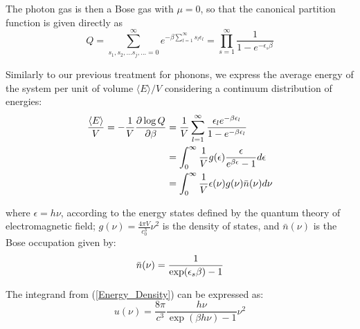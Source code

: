 \documentclass[book.tex]{subfiles}
\begin{document}
The photon gas is then a Bose gas with $\mu= 0$, so that the canonical partition function is given directly as
\begin{equation}\label{Part_photon}
Q = \sum_{s_1,s_2,...s_j,... = 0}^\infty e^{- \beta \sum_{l=1}^\infty s_l\epsilon_l} = \prod_{s=1}^\infty \frac{1}{1-e^{-\epsilon_{s}\beta}}
\end{equation}

Similarly to our previous treatment for phonons, we express the average energy of the system per unit of volume $\langle E\rangle/V$ considering a continuum distribution of energies:
\begin{align}\label{Energy_Density}
\frac{\langle E \rangle}{V} = -\frac{1}{V}\frac{\partial \log Q}{\partial \beta} &= \frac{1}{V}\sum_{l=1}^\infty \frac{\epsilon_le^{-\beta\epsilon_l}}{1 - e^{-\beta\epsilon_l}} \notag\\
&= \int_0^\infty \frac{1}{V}g(\epsilon)  \frac{\epsilon}{e^{\beta\epsilon}-1} d\epsilon \notag\\
&= \int_0^\infty \frac{1}{V}\epsilon(\nu)g(\nu)\bar{n}(\nu) d\nu
\end{align}

\noindent where $\epsilon=h\nu$, according to the energy states defined by the quantum theory of electromagnetic field; $g(\nu)=\frac{4\pi V}{c_0^3}\nu^2$ is the density of states, and $\bar{n}(\nu)$ is the Bose occupation given by:
\begin{equation}
\bar{n}(\nu) = \frac{1}{\exp(\epsilon_{s}\beta)-1} \notag
\end{equation}

The integrand from (\ref{Energy_Density}) can be expressed as:
\begin{equation}\label{Planck}
u(\nu) = \frac{8\pi}{c^{3}}\frac{h\nu}{\exp(\beta h\nu)-1}\nu^{2}
\end{equation}
\end{document}
